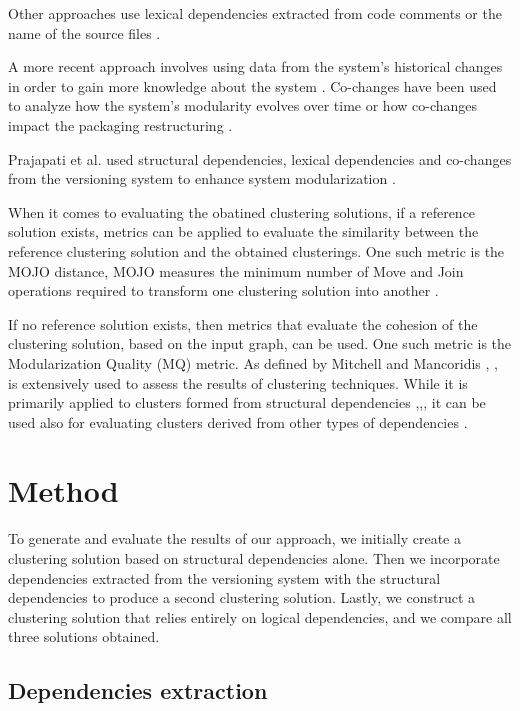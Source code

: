 \documentclass[conference]{IEEEtran}
\begin{document}
Other approaches use lexical dependencies extracted from code comments \cite{5741257} or the name of the source files \cite{Anquetil1999RecoveringSA} \cite{Anquetil1998RecoveringSA}. 

A more recent approach involves using data from the system's historical changes in order to gain more knowledge about the system \cite{article-cochangem}. Co-changes have been used to analyze how the system's modularity evolves over time \cite{10.1145/3196398.3196409} or how co-changes impact the packaging restructuring \cite{clusters-cochange}.

Prajapati et al. used structural dependencies, lexical dependencies and co-changes from the versioning system to enhance system modularization \cite{clustering-ld-lexical}.

When it comes to evaluating the obatined clustering solutions,  if a reference solution exists, metrics can be applied to evaluate the similarity between the reference clustering solution and the obtained clusterings. One such metric is the MOJO distance, MOJO measures the minimum number of Move and Join operations required to transform one clustering solution into another \cite{mojo-tzerpos}. 


If no reference solution exists, then metrics that evaluate the cohesion of the clustering solution, based on the input graph, can be used. One such metric is the Modularization Quality (MQ) metric. As defined by Mitchell and Mancoridis \cite{mqmetric}, \cite{mqmetric2}, is extensively used to assess the results of clustering techniques. While it is primarily applied to clusters formed from structural dependencies \cite{Bunch1},\cite{Bunch2},\cite{Bunch3}, it can be used also for evaluating clusters derived from other types of dependencies \cite{clustering-ld-lexical}.


\section{Method}
\label{method}

To generate and evaluate the results of our approach, we initially create a clustering solution based on structural dependencies alone. Then we incorporate dependencies extracted from the versioning system with the structural dependencies to produce a second clustering solution. Lastly, we construct a clustering solution that relies entirely on logical dependencies, and we compare all three solutions obtained.

\subsection{Dependencies extraction}
\end{document}
